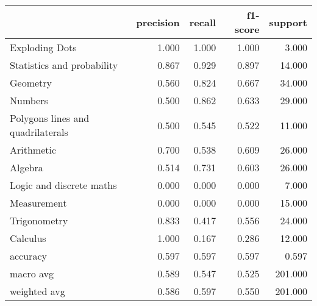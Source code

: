 \begin{tabular}{lrrrr}
\toprule
{} &  precision &  recall &  f1-score &  support \\
\midrule
Exploding Dots                    &      1.000 &   1.000 &     1.000 &    3.000 \\
Statistics and probability        &      0.867 &   0.929 &     0.897 &   14.000 \\
Geometry                          &      0.560 &   0.824 &     0.667 &   34.000 \\
Numbers                           &      0.500 &   0.862 &     0.633 &   29.000 \\
Polygons lines and quadrilaterals &      0.500 &   0.545 &     0.522 &   11.000 \\
Arithmetic                        &      0.700 &   0.538 &     0.609 &   26.000 \\
Algebra                           &      0.514 &   0.731 &     0.603 &   26.000 \\
Logic and discrete maths          &      0.000 &   0.000 &     0.000 &    7.000 \\
Measurement                       &      0.000 &   0.000 &     0.000 &   15.000 \\
Trigonometry                      &      0.833 &   0.417 &     0.556 &   24.000 \\
Calculus                          &      1.000 &   0.167 &     0.286 &   12.000 \\
accuracy                          &      0.597 &   0.597 &     0.597 &    0.597 \\
macro avg                         &      0.589 &   0.547 &     0.525 &  201.000 \\
weighted avg                      &      0.586 &   0.597 &     0.550 &  201.000 \\
\bottomrule
\end{tabular}
